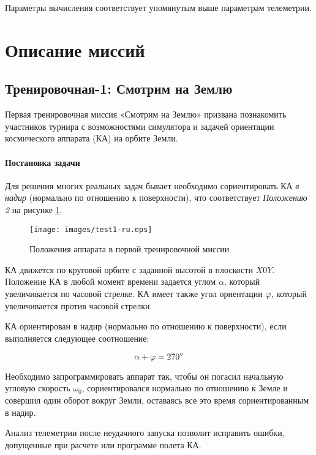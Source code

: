 \documentclass[12pt,a4paper]{article}
\begin{document}
Параметры вычисления соответствует упомянутым выше параметрам телеметрии.

\section{Описание миссий}
\label{Sec:Missions}

\subsection{Тренировочная-1: Смотрим на Землю}

Первая тренировочная миссия «Смотрим на Землю» призвана познакомить участников турнира с
возможностями симулятора и задачей ориентации космического аппарата (КА) на орбите Земли.

\paragraph{Постановка задачи} Для решения многих реальных задач бывает необходимо сориентировать КА \emph{в надир} (нормально
по отношению к поверхности), что соответствует \emph{Положению 2} на рисунке \ref{Pic:test1}.

\begin{figure}[tbh]
  \begin{center}
    \texttt{[image: images/test1-ru.eps]}
    \caption{Положения аппарата в первой тренировочной миссии}
    \label{Pic:test1}
  \end{center}
\end{figure}

КА движется по круговой орбите с заданной высотой в плоскости $X0Y$. Положение КА в любой
момент времени задается углом $\alpha$, который увеличивается по часовой стрелке. КА имеет
также угол ориентации $\varphi$, который увеличивается против часовой стрелки.

КА ориентирован в надир (нормально по отношению к поверхности), если выполняется следующее
соотношение:

$$
\alpha + \varphi = 270 \degree
$$

Необходимо запрограммировать аппарат так, чтобы он погасил начальную угловую скорость $\omega_0$,
сориентировался нормально по отношению к Земле и совершил один оборот вокруг Земли,
оставаясь все это время сориентированным в надир.

Анализ телеметрии после неудачного запуска позволит исправить ошибки, допущенные при
расчете или программе полета КА.
\end{document}
